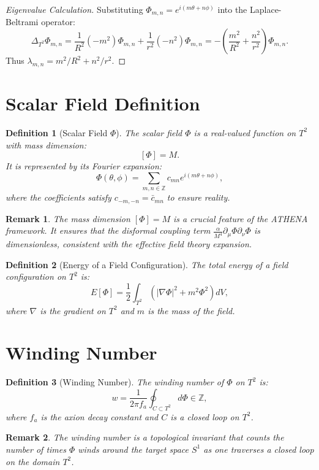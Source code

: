 \documentclass[12pt,oneside]{book}
\newtheorem{definition}{Definition}[chapter]
\newtheorem{remark}{Remark}[chapter]
\begin{document}
\begin{proof}[Eigenvalue Calculation]
Substituting $\Phi_{m,n} = e^{i(m\theta + n\phi)}$ into the Laplace-Beltrami operator:
\[
\Delta_{T^2}\Phi_{m,n} = \frac{1}{R^2}(-m^2)\Phi_{m,n} + \frac{1}{r^2}(-n^2)\Phi_{m,n}
= -\left(\frac{m^2}{R^2} + \frac{n^2}{r^2}\right)\Phi_{m,n}.
\]
Thus $\lambda_{m,n} = m^2/R^2 + n^2/r^2$.
\end{proof}

\section{Scalar Field Definition}

\begin{definition}[Scalar Field $\Phi$]
The scalar field $\Phi$ is a real-valued function on $T^2$ with mass dimension:
\[
[\Phi] = M.
\]
It is represented by its Fourier expansion:
\[
\Phi(\theta,\phi) = \sum_{m,n\in\mathbb{Z}} c_{mn} e^{i(m\theta + n\phi)},
\]
where the coefficients satisfy $c_{-m,-n} = \bar{c}_{mn}$ to ensure reality.
\end{definition}

\begin{remark}
The mass dimension $[\Phi] = M$ is a crucial feature of the ATHENA framework. It ensures that the disformal coupling term $\frac{\alpha}{M^4}\partial_\mu\Phi \partial_\nu\Phi$ is dimensionless, consistent with the effective field theory expansion.
\end{remark}

\begin{definition}[Energy of a Field Configuration]
The total energy of a field configuration on $T^2$ is:
\[
E[\Phi] = \frac{1}{2}\int_{T^2} \left(|\nabla\Phi|^2 + m^2\Phi^2\right) dV,
\]
where $\nabla$ is the gradient on $T^2$ and $m$ is the mass of the field.
\end{definition}

\section{Winding Number}

\begin{definition}[Winding Number]
The winding number of $\Phi$ on $T^2$ is:
\[
w = \frac{1}{2\pi f_a} \oint_{C \subset T^2} d\Phi \in \mathbb{Z},
\]
where $f_a$ is the axion decay constant and $C$ is a closed loop on $T^2$.
\end{definition}

\begin{remark}
The winding number is a topological invariant that counts the number of times $\Phi$ winds around the target space $S^1$ as one traverses a closed loop on the domain $T^2$.
\end{remark}
\end{document}
